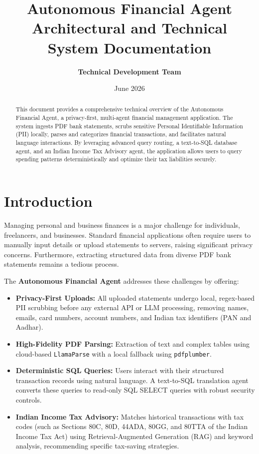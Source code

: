 \documentclass[11pt,a4paper]{article}
\title{\textbf{Autonomous Financial Agent}\\Architectural and Technical System Documentation}
\author{\textbf{Technical Development Team}}
\date{June 2026}
\begin{document}
\maketitle

\begin{abstract}
This document provides a comprehensive technical overview of the Autonomous Financial Agent, a privacy-first, multi-agent financial management application. The system ingests PDF bank statements, scrubs sensitive Personal Identifiable Information (PII) locally, parses and categorizes financial transactions, and facilitates natural language interactions. By leveraging advanced query routing, a text-to-SQL database agent, and an Indian Income Tax Advisory agent, the application allows users to query spending patterns deterministically and optimize their tax liabilities securely.
\end{abstract}

\tableofcontents
\newpage

\section{Introduction}
Managing personal and business finances is a major challenge for individuals, freelancers, and businesses. Standard financial applications often require users to manually input details or upload statements to servers, raising significant privacy concerns. Furthermore, extracting structured data from diverse PDF bank statements remains a tedious process.

The \textbf{Autonomous Financial Agent} addresses these challenges by offering:
\begin{itemize}
    \item \textbf{Privacy-First Uploads:} All uploaded statements undergo local, regex-based PII scrubbing before any external API or LLM processing, removing names, emails, card numbers, account numbers, and Indian tax identifiers (PAN and Aadhar).
    \item \textbf{High-Fidelity PDF Parsing:} Extraction of text and complex tables using cloud-based \texttt{LlamaParse} with a local fallback using \texttt{pdfplumber}.
    \item \textbf{Deterministic SQL Queries:} Users interact with their structured transaction records using natural language. A text-to-SQL translation agent converts these queries to read-only SQL SELECT queries with robust security controls.
    \item \textbf{Indian Income Tax Advisory:} Matches historical transactions with tax codes (such as Sections 80C, 80D, 44ADA, 80GG, and 80TTA of the Indian Income Tax Act) using Retrieval-Augmented Generation (RAG) and keyword analysis, recommending specific tax-saving strategies.
\end{itemize}
\end{document}
